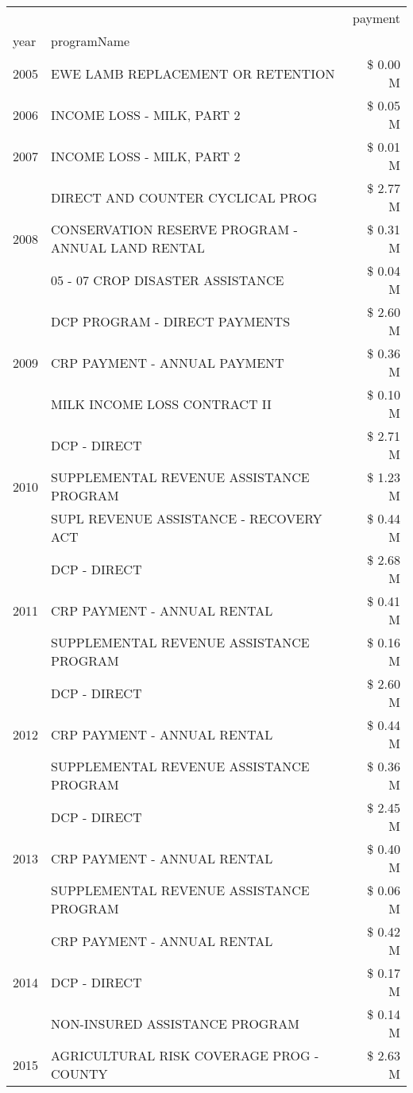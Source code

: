 \begin{tabular}{llr}
\toprule
 &  & payment \\
year & programName &  \\
\midrule
2005 & EWE LAMB REPLACEMENT OR RETENTION & \$ 0.00 M \\
\cline{1-3}
2006 & INCOME LOSS - MILK, PART 2 & \$ 0.05 M \\
\cline{1-3}
2007 & INCOME LOSS - MILK, PART 2 & \$ 0.01 M \\
\cline{1-3}
\multirow[t]{3}{*}{2008} & DIRECT AND COUNTER CYCLICAL PROG & \$ 2.77 M \\
 & CONSERVATION RESERVE PROGRAM - ANNUAL LAND RENTAL & \$ 0.31 M \\
 & 05 - 07 CROP DISASTER ASSISTANCE & \$ 0.04 M \\
\cline{1-3}
\multirow[t]{3}{*}{2009} & DCP PROGRAM - DIRECT PAYMENTS & \$ 2.60 M \\
 & CRP PAYMENT - ANNUAL PAYMENT & \$ 0.36 M \\
 & MILK INCOME LOSS CONTRACT II & \$ 0.10 M \\
\cline{1-3}
\multirow[t]{3}{*}{2010} & DCP - DIRECT & \$ 2.71 M \\
 & SUPPLEMENTAL REVENUE ASSISTANCE PROGRAM & \$ 1.23 M \\
 & SUPL REVENUE ASSISTANCE - RECOVERY ACT & \$ 0.44 M \\
\cline{1-3}
\multirow[t]{3}{*}{2011} & DCP - DIRECT & \$ 2.68 M \\
 & CRP PAYMENT - ANNUAL RENTAL & \$ 0.41 M \\
 & SUPPLEMENTAL REVENUE ASSISTANCE PROGRAM & \$ 0.16 M \\
\cline{1-3}
\multirow[t]{3}{*}{2012} & DCP - DIRECT & \$ 2.60 M \\
 & CRP PAYMENT - ANNUAL RENTAL & \$ 0.44 M \\
 & SUPPLEMENTAL REVENUE ASSISTANCE PROGRAM & \$ 0.36 M \\
\cline{1-3}
\multirow[t]{3}{*}{2013} & DCP - DIRECT & \$ 2.45 M \\
 & CRP PAYMENT - ANNUAL RENTAL & \$ 0.40 M \\
 & SUPPLEMENTAL REVENUE ASSISTANCE PROGRAM & \$ 0.06 M \\
\cline{1-3}
\multirow[t]{3}{*}{2014} & CRP PAYMENT - ANNUAL RENTAL & \$ 0.42 M \\
 & DCP - DIRECT & \$ 0.17 M \\
 & NON-INSURED ASSISTANCE PROGRAM & \$ 0.14 M \\
\cline{1-3}
\multirow[t]{3}{*}{2015} & AGRICULTURAL RISK COVERAGE PROG - COUNTY & \$ 2.63 M \\

\end{tabular}
